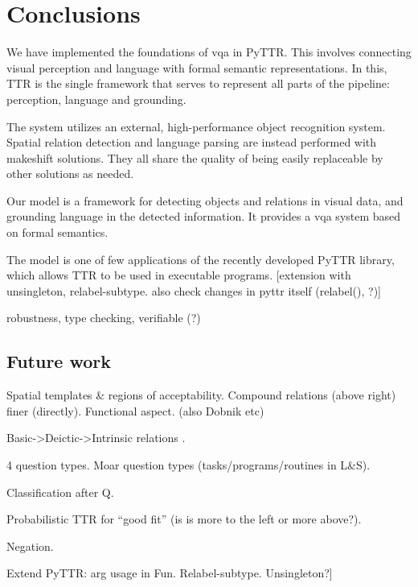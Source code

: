 \section{Conclusions}
\label{sec:conclusions}

We have implemented the foundations of \gls{vqa} in PyTTR.
This involves connecting visual perception and language with formal semantic representations.
In this, TTR is the single framework that serves to represent all parts of the pipeline: perception, language and grounding.

The system utilizes an external, high-performance object recognition system.
Spatial relation detection and language parsing are instead performed with makeshift solutions.
They all share the quality of being easily replaceable by other solutions as needed.

Our model is a framework for detecting objects and relations in visual data, and grounding language in the detected information.
It provides a \gls{vqa} system based on formal semantics.

The model is one of few applications of the recently developed PyTTR library, which allows TTR to be used in executable programs.
[extension with unsingleton, relabel-subtype. also check changes in pyttr itself (relabel(), ?)]


robustness, type checking, verifiable (?)



\subsection{Future work}


Spatial templates \& regions of acceptability. Compound relations (above right) finer (directly). Functional aspect.  \cite{LoganComputationalAnalysisApprehension1996} (also Dobnik etc)

Basic->Deictic->Intrinsic relations  \cite{LoganComputationalAnalysisApprehension1996}.

4 question types.
Moar question types (tasks/programs/routines in L\&S).


Classification after Q.

Probabilistic TTR for ``good fit'' (is is more to the left or more above?).

Negation.

Extend PyTTR: arg usage in Fun. Relabel-subtype. Unsingleton?]
